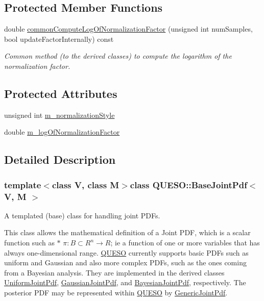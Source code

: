 \subsection*{Protected Member Functions}
\begin{DoxyCompactItemize}
\item 
double \hyperlink{class_q_u_e_s_o_1_1_base_joint_pdf_a7b7bdd13d2de51198bf75d522e02545b}{common\-Compute\-Log\-Of\-Normalization\-Factor} (unsigned int num\-Samples, bool update\-Factor\-Internally) const 
\begin{DoxyCompactList}\small\item\em Common method (to the derived classes) to compute the logarithm of the normalization factor. \end{DoxyCompactList}\end{DoxyCompactItemize}
\subsection*{Protected Attributes}
\begin{DoxyCompactItemize}
\item 
unsigned int \hyperlink{class_q_u_e_s_o_1_1_base_joint_pdf_a138c99bcef7a67077d9612bddfdcb896}{m\-\_\-normalization\-Style}
\item 
double \hyperlink{class_q_u_e_s_o_1_1_base_joint_pdf_ae82d4191f17af8c7a26226d127bc7850}{m\-\_\-log\-Of\-Normalization\-Factor}
\end{DoxyCompactItemize}


\subsection{Detailed Description}
\subsubsection*{template$<$class V, class M$>$class Q\-U\-E\-S\-O\-::\-Base\-Joint\-Pdf$<$ V, M $>$}

A templated (base) class for handling joint P\-D\-Fs. 

This class allows the mathematical definition of a Joint P\-D\-F, which is a scalar function such as $\ast$ $ \pi: B \subset R^n \rightarrow R $; ie a function of one or more variables that has always one-\/dimensional range. \hyperlink{namespace_q_u_e_s_o}{Q\-U\-E\-S\-O} currently supports basic P\-D\-Fs such as uniform and Gaussian and also more complex P\-D\-Fs, such as the ones coming from a Bayesian analysis. They are implemented in the derived classes \hyperlink{class_q_u_e_s_o_1_1_uniform_joint_pdf}{Uniform\-Joint\-Pdf}, \hyperlink{class_q_u_e_s_o_1_1_gaussian_joint_pdf}{Gaussian\-Joint\-Pdf}, and \hyperlink{class_q_u_e_s_o_1_1_bayesian_joint_pdf}{Bayesian\-Joint\-Pdf}, respectively. The posterior P\-D\-F may be represented within \hyperlink{namespace_q_u_e_s_o}{Q\-U\-E\-S\-O} by \hyperlink{class_q_u_e_s_o_1_1_generic_joint_pdf}{Generic\-Joint\-Pdf}. 

